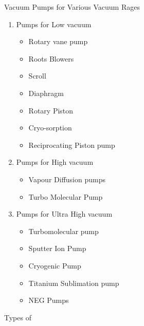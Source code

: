 \documentclass[11]{beamer}
\begin{document}
\begin{frame}{Vacuum Pumps for Various Vacuum Rages}

\begin{enumerate}
\item Pumps for Low vacuum
	\begin{itemize}
	\item Rotary vane pump
    \item    Roots Blowers
     \item   Scroll
      \item  Diaphragm
      \item  Rotary Piston
      \item  Cryo-sorption
     \item   Reciprocating Piston pump
	\end{itemize}
	
\item Pumps for High vacuum
        
        \begin{itemize}
			\item Vapour Diffusion pumps	
    		\item    Turbo Molecular Pump
	    \end{itemize}
	
\item Pumps for Ultra High vacuum
        
        \begin{itemize}
			\item Turbomolecular pump
      		\item 	 Sputter Ion Pump
       		\item 		Cryogenic Pump
       		\item 		Titanium Sublimation pump
       		\item 		NEG Pumps
    		   
	    \end{itemize}


\end{enumerate}


\end{frame}





\begin{frame}{Types of }

\end{frame}






\begin{frame}

\end{frame}
\end{document}
